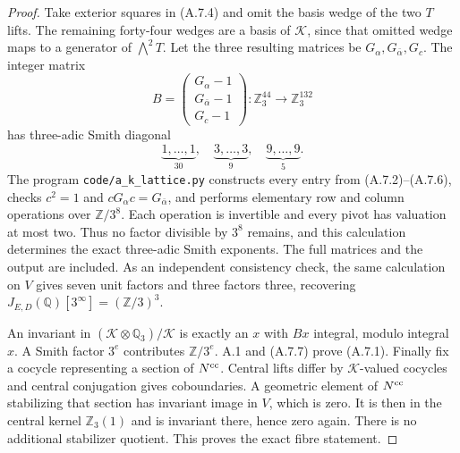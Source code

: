 \begin{proof}
Take exterior squares in (A.7.4) and omit the basis wedge of the
two $T$ lifts. The remaining forty-four wedges are a basis of
$\mathcal K$, since that omitted wedge maps to a generator of
$\bigwedge^2T$. Let the three resulting matrices be
$G_\alpha,G_{\bar\alpha},G_c$. The integer matrix
\[
 B=\begin{pmatrix}G_\alpha-1\\G_{\bar\alpha}-1\\G_c-1\end{pmatrix}
       :\mathbb Z_3^{44}\longrightarrow\mathbb Z_3^{132}
 \tag{A.7.6}
\]
has three-adic Smith diagonal
\[
 \underbrace{1,\ldots,1}_{30},\quad
 \underbrace{3,\ldots,3}_{9},\quad
 \underbrace{9,\ldots,9}_{5}.
 \tag{A.7.7}
\]
The program \texttt{code/a\_k\_lattice.py} constructs every entry
from (A.7.2)--(A.7.6), checks $c^2=1$ and
$cG_\alpha c=G_{\bar\alpha}$, and performs elementary row and
column operations over $\mathbb Z/3^8$. Each operation is
invertible and every pivot has valuation at most two. Thus no
factor divisible by $3^8$ remains, and this calculation determines
the exact three-adic Smith exponents. The full matrices and the
output are included. As an independent consistency check, the
same calculation on $V$ gives seven unit factors and three factors
three, recovering $J_{E,D}(\mathbb Q)[3^\infty]=(\mathbb Z/3)^3$.

An invariant in $(\mathcal K\otimes\mathbb Q_3)/\mathcal K$ is
exactly an $x$ with $Bx$ integral, modulo integral $x$. A Smith
factor $3^e$ contributes $\mathbb Z/3^e$. A.1 and (A.7.7) prove
(A.7.1). Finally fix a cocycle representing a section of
$N^{\rm cc}$. Central lifts differ by $\mathcal K$-valued cocycles
and central conjugation gives coboundaries. A geometric element
of $N^{\rm cc}$ stabilizing that section has invariant image in
$V$, which is zero. It is then in the central kernel
$\mathbb Z_3(1)$ and is invariant there, hence zero again.
There is no additional stabilizer quotient. This proves the exact
fibre statement.
\end{proof}

